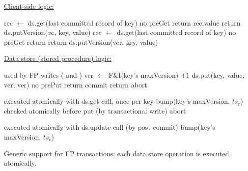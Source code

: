 \begin{algorithm}[htb]

\underline{Client-side logic:}
\begin{algorithmic}[1]
{} \label{l:brc}
\State rec  $\leftarrow$ ds.get(last committed record of key)  \Comment no preGet
\State  return rec.value
\EndProcedure
{} 
	\State return {ds.putVersion}($\infty$, key, value)
\EndProcedure
{} 
\State rec  $\leftarrow$ ds.get(last committed record of key) \Comment no preGet
\State  return 
\EndProcedure
{} 
\State return {ds.putVersion}(ver, key, value)
\EndProcedure
\Statex
{}
\end{algorithmic}

\underline{Data store (stored procedure) logic:}
\begin{algorithmic}[1]
{} 
\Statex \Comment used by FP writes ( and )
		\State ver $\leftarrow$ F\&I(key's maxVersion) $+1$   \label{l:fi}
		\State ds.put(key, value, ver, ver) 	\Comment no prePut	%
		\State return commit
	\Else 
		\State return abort 
	\EndIf
\EndProcedure

\Statex
{}   \label{l:txr}
\Statex \Comment executed atomically with ds.get call, once per key 
\State bump(key's maxVersion, $ts_r$)
\EndProcedure
{}   \label{l:txw}
 \Statex \Comment checked atomically before put (by transactional write)
 	\State abort 
 \EndIf
\EndProcedure

   \label{l:txu}
\Statex \Comment executed atomically with ds.update call (by  post-commit) 
\State bump(key's maxVersion, $ts_c$)
\EndProcedure
\end{algorithmic}
\caption{Generic support for FP transactions; each data store operation is executed atomically.}
\label{alg:fp}
\end{algorithm}

